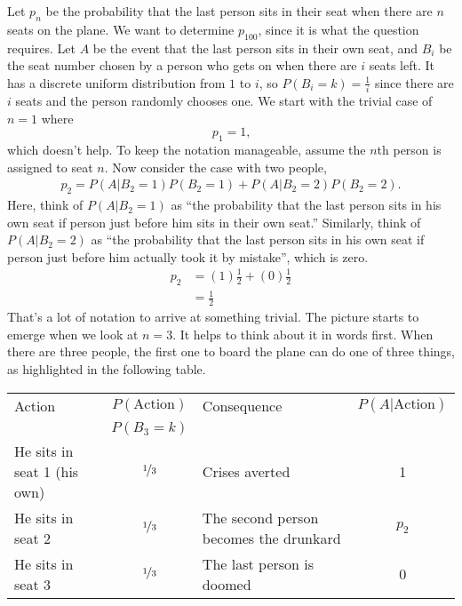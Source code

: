 \documentclass[a4paper]{article}
\begin{document}
Let $p_n$ be the probability that the last person sits in their seat when there are $n$ seats on the plane.
We want to determine $p_{100}$, since it is what the question requires.
Let $A$ be the event that the last person sits in their own seat, and $B_i$ be the seat number chosen by a person who gets on when there are $i$ seats left.
It has a discrete uniform distribution from $1$ to $i$, so $P(B_i = k) = \frac{1}{i}$ since there are $i$ seats and the person randomly chooses one.
We start with the trivial case of $n=1$ where
\[
  p_1 = 1
  \text{,}
\]
which doesn't help.
To keep the notation manageable, assume the $n$th person is assigned to seat $n$.
Now consider the case with two people,
\begin{align*}
  p_2 = P(A|B_2 = 1)P(B_2=1) + P(A|B_2 = 2)P(B_2=2)
  \text{.}
\end{align*}
Here, think of  $P(A|B_2 = 1)$ as ``the probability that the last person sits in his own seat if person just before him sits in their own seat.''
Similarly, think of  $P(A|B_2 = 2)$ as ``the probability that the last person sits in his own seat if person just before him actually took it by mistake'', which is zero.
\begin{align*}
  p_2 &= (1)\frac{1}{2} + (0)\frac{1}{2} \\
  &= \frac{1}{2}
\end{align*}
That's a lot of notation to arrive at something trivial.
The picture starts to emerge when we look at $n=3$.
It helps to think about it in words first.
When there are three people, the first one to board the plane can do one of three things, as highlighted in the following table.
\begin{center}
\begin{tabular}{lclc}
\hline
 Action                    & $P(\text{Action})$ &  Consequence                             & $P(A|\text{Action})$ \\
                           & $P(B_3 = k)$       &                                          &               \\
 \hline
He sits in seat 1 (his own)& $\nicefrac{1}{3}$  &  Crises averted                          & 1\\
He sits in seat 2          & $\nicefrac{1}{3}$  &  The second person becomes the drunkard  & $p_2$\\
He sits in seat 3          & $\nicefrac{1}{3}$  &  The last person is doomed               & 0\\
\hline
\end{tabular}
\end{center}
\end{document}
